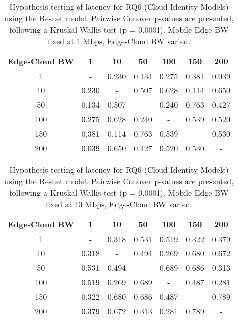 \begin{table}[H]
\caption{Hypothesis testing of latency for RQ6 (Cloud Identity Models) using the Resnet model. Pairwise Conover p-values are presented, following a Kruskal-Wallis test (p = 0.0001). Mobile-Edge BW fixed at 1 Mbps, Edge-Cloud BW varied.}
\centering
\begin{tabular}{c|cccccc}
Edge-Cloud BW & 1 & 10 & 50 & 100 & 150 & 200 \\
\hline
1 & - & 0.230 & 0.134 & 0.275 & 0.381 & 0.039 \\
10 & 0.230 & - & 0.507 & 0.628 & 0.114 & 0.650 \\
50 & 0.134 & 0.507 & - & 0.240 & 0.763 & 0.427 \\
100 & 0.275 & 0.628 & 0.240 & - & 0.539 & 0.520 \\
150 & 0.381 & 0.114 & 0.763 & 0.539 & - & 0.530 \\
200 & 0.039 & 0.650 & 0.427 & 0.520 & 0.530 & - \\
\end{tabular}
\end{table}

\begin{table}[H]
\caption{Hypothesis testing of latency for RQ6 (Cloud Identity Models) using the Resnet model. Pairwise Conover p-values are presented, following a Kruskal-Wallis test (p = 0.0001). Mobile-Edge BW fixed at 10 Mbps, Edge-Cloud BW varied.}
\centering
\begin{tabular}{c|cccccc}
Edge-Cloud BW & 1 & 10 & 50 & 100 & 150 & 200 \\
\hline
1 & - & 0.318 & 0.531 & 0.519 & 0.322 & 0.379 \\
10 & 0.318 & - & 0.494 & 0.269 & 0.680 & 0.672 \\
50 & 0.531 & 0.494 & - & 0.689 & 0.686 & 0.313 \\
100 & 0.519 & 0.269 & 0.689 & - & 0.487 & 0.281 \\
150 & 0.322 & 0.680 & 0.686 & 0.487 & - & 0.789 \\
200 & 0.379 & 0.672 & 0.313 & 0.281 & 0.789 & - \\
\end{tabular}
\end{table}

